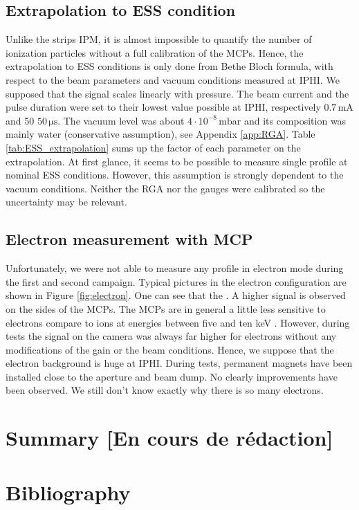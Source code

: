 \begin{refsection}
  \subsection{Extrapolation to ESS condition}
  Unlike the strips IPM, it is almost impossible to quantify the number of ionization particles without a full calibration of the MCPs. Hence, the extrapolation to ESS conditions is only done from Bethe Bloch formula, with respect to the beam parameters and vacuum conditions measured at IPHI. We supposed that the signal scales linearly with pressure. The beam current and the pulse duration were set to their lowest value possible at IPHI, respectively $0.7\,\mathrm{mA}$ and 50 $50\, \mathrm{\mu s}$. The vacuum level was about $4 \cdot 10^{-8}\,\mathrm{mbar}$ and its composition was mainly water (conservative assumption), see Appendix \ref{app:RGA}. Table \ref{tab:ESS_extrapolation} sums up the factor of each parameter on the extrapolation. At first glance, it seems to be possible to measure single profile at nominal ESS conditions. However, this assumption is strongly dependent to the vacuum conditions. Neither the RGA nor the gauges were calibrated so the uncertainty may be relevant.
  

  \subsection{Electron measurement with MCP}
  Unfortunately, we were not able to measure any profile in electron mode during the first and second campaign.
  Typical pictures in the electron configuration are shown in Figure \ref{fig:electron}. One can see that the . A higher signal is observed on the sides of the MCPs.
  The MCPs are in general a little less sensitive to electrons compare to ions at energies between five and ten keV \cite{Wiza1979}.
  However, during tests the signal on the camera was always far higher for electrons without any modifications of the gain or the beam conditions.
  Hence, we suppose that the electron background is huge at IPHI.
  During tests, permanent magnets have been installed close to the aperture and beam dump. No clearly improvements have been observed. We still don't know exactly why there is so many electrons.
  

  \section{Summary [En cours de rédaction]}
  \label{ch4:Summary}

  \cleardoublepage
  \section{Bibliography}
  \label{ch4:bib}
  \printbibliography[heading=subbibliography]

\end{refsection}
